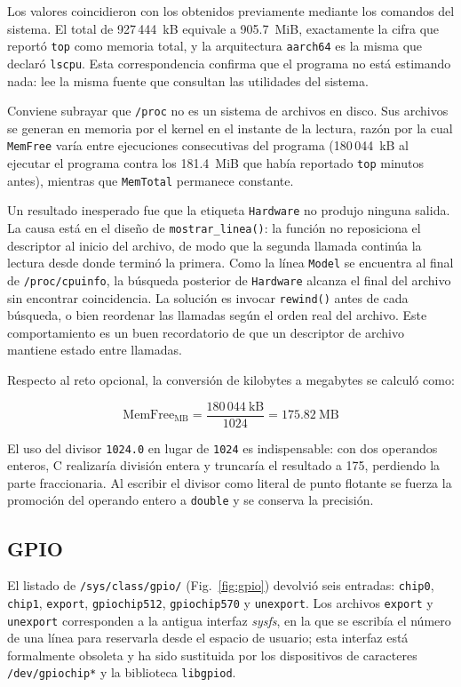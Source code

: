 \documentclass[conference]{IEEEtran}
\begin{document}
Los valores coincidieron con los obtenidos previamente mediante los comandos del sistema. El total de 927\,444~kB equivale a 905.7~MiB, exactamente la cifra que reportó \texttt{top} como memoria total, y la arquitectura \texttt{aarch64} es la misma que declaró \texttt{lscpu}. Esta correspondencia confirma que el programa no está estimando nada: lee la misma fuente que consultan las utilidades del sistema.

Conviene subrayar que \texttt{/proc} no es un sistema de archivos en disco. Sus archivos se generan en memoria por el kernel en el instante de la lectura, razón por la cual \texttt{MemFree} varía entre ejecuciones consecutivas del programa (180\,044~kB al ejecutar el programa contra los 181.4~MiB que había reportado \texttt{top} minutos antes), mientras que \texttt{MemTotal} permanece constante.

Un resultado inesperado fue que la etiqueta \texttt{Hardware} no produjo ninguna salida. La causa está en el diseño de \texttt{mostrar\_linea()}: la función no reposiciona el descriptor al inicio del archivo, de modo que la segunda llamada continúa la lectura desde donde terminó la primera. Como la línea \texttt{Model} se encuentra al final de \texttt{/proc/cpuinfo}, la búsqueda posterior de \texttt{Hardware} alcanza el final del archivo sin encontrar coincidencia. La solución es invocar \texttt{rewind()} antes de cada búsqueda, o bien reordenar las llamadas según el orden real del archivo. Este comportamiento es un buen recordatorio de que un descriptor de archivo mantiene estado entre llamadas.

Respecto al reto opcional, la conversión de kilobytes a megabytes se calculó como:

\begin{equation}
	\text{MemFree}_{\text{MB}} = \frac{180\,044~\text{kB}}{1024} = 175.82~\text{MB}
\end{equation}

El uso del divisor \texttt{1024.0} en lugar de \texttt{1024} es indispensable: con dos operandos enteros, C realizaría división entera y truncaría el resultado a 175, perdiendo la parte fraccionaria. Al escribir el divisor como literal de punto flotante se fuerza la promoción del operando entero a \texttt{double} y se conserva la precisión.

\subsection{GPIO}
El listado de \texttt{/sys/class/gpio/} (Fig.~\ref{fig:gpio}) devolvió seis entradas: \texttt{chip0}, \texttt{chip1}, \texttt{export}, \texttt{gpiochip512}, \texttt{gpiochip570} y \texttt{unexport}. Los archivos \texttt{export} y \texttt{unexport} corresponden a la antigua interfaz \textit{sysfs}, en la que se escribía el número de una línea para reservarla desde el espacio de usuario; esta interfaz está formalmente obsoleta y ha sido sustituida por los dispositivos de caracteres \texttt{/dev/gpiochip*} y la biblioteca \texttt{libgpiod}.
\end{document}
